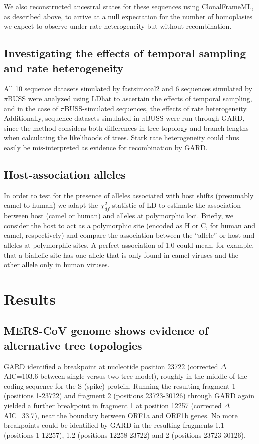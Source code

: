 \documentclass[11pt,oneside,letterpaper]{article}
\begin{document}
We also reconstructed ancestral states for these sequences using ClonalFrameML, as described above, to arrive at a null expectation for the number of homoplasies we expect to observe under rate heterogeneity but without recombination.

\subsection*{Investigating the effects of temporal sampling and rate heterogeneity}
All 10 sequence datasets simulated by fastsimcoal2 and 6 sequences simulated by $\pi$BUSS were analyzed using LDhat to ascertain the effects of temporal sampling, and in the case of $\pi$BUSS-simulated sequences, the effects of rate heterogeneity.
Additionally, sequence datasets simulated in $\pi$BUSS were run through GARD, since the method considers both differences in tree topology and branch lengths when calculating the likelihoods of trees.
Stark rate heterogeneity could thus easily be mis-interpreted as evidence for recombination by GARD.

\subsection*{Host-association alleles}
In order to test for the presence of alleles associated with host shifts (presumably camel to human) we adapt the $\chi^{2}_{df}$ \citep{zhao2005} statistic of LD to estimate the association between host (camel or human) and alleles at polymorphic loci.
Briefly, we consider the host to act as a polymorphic site (encoded as H or C, for human and camel, respectively) and compare the association between the ``allele'' or host and alleles at polymorphic sites.
A perfect association of 1.0 could mean, for example, that a biallelic site has one allele that is only found in camel viruses and the other allele only in human viruses.

\section*{Results}
\subsection*{MERS-CoV genome shows evidence of alternative tree topologies}
GARD identified a breakpoint at nucleotide position 23722 (corrected $\Delta$AIC=103.6 between single versus two tree model), roughly in the middle of the coding sequence for the S (spike) protein.
Running the resulting fragment 1 (positions 1-23722) and fragment 2 (positions 23723-30126) through GARD again yielded a further breakpoint in fragment 1 at position 12257 (corrected $\Delta$AIC=33.7), near the boundary between ORF1a and ORF1b genes.
No more breakpoints could be identified by GARD in the resulting fragments 1.1 (positions 1-12257), 1.2 (positions 12258-23722) and 2 (positions 23723-30126).
\end{document}

